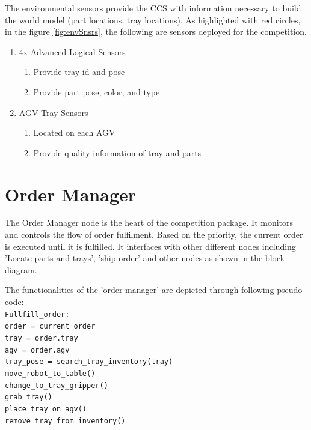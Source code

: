\documentclass{uva-inf-article}
\begin{document}
The environmental sensors provide the CCS with information necessary to build the world model (part locations, tray locations). As highlighted with red circles, in the figure \ref{fig:envSnsrs}, the following are sensors deployed for the competition.

\begin{enumerate}
    \item \justifying 4x Advanced Logical Sensors
        \begin{enumerate}
            \item \justifying Provide tray id and pose
            \item \justifying Provide part pose, color, and type
        \end{enumerate}
    \item \justifying AGV Tray Sensors
        \begin{enumerate}
            \item \justifying Located on each AGV
            \item \justifying Provide quality information of tray and parts
        \end{enumerate}
\end{enumerate}

\justifying
\section{Order Manager} \label{OrderManager}
The Order Manager node is the heart of the competition package.
It monitors and controls the flow of order fulfilment. Based on the priority, the current order is executed until it is fulfilled. It interfaces with other different nodes including 'Locate parts and trays', 'ship order' and other nodes as shown in the block diagram.

The functionalities of the 'order manager' are depicted through following pseudo code:\\

\noindent \verb|Fullfill_order:|\\
	\verb|order = current_order|\\
	\verb|tray = order.tray|\\
	\verb|agv = order.agv|\\
	
	\noindent \verb|tray_pose = search_tray_inventory(tray)|\\
	\verb|move_robot_to_table()|\\
	\verb|change_to_tray_gripper()|\\
	\verb|grab_tray()|\\
	\verb|place_tray_on_agv()|\\
	\verb|remove_tray_from_inventory()|\\
\end{document}
